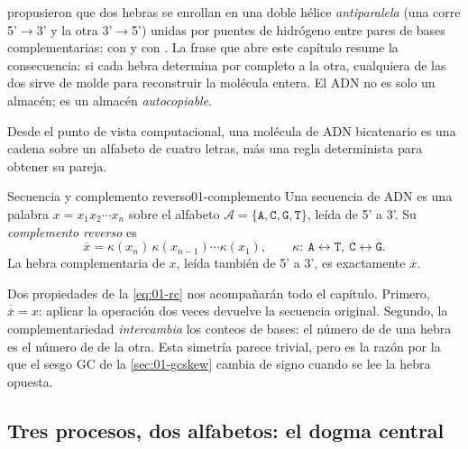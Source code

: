 \textcite{c01-watson1953} propusieron que dos hebras se enrollan en una doble hélice \emph{antiparalela} (una corre 5'$\to$3' y la otra 3'$\to$5') unidas por puentes de hidrógeno entre pares de bases complementarias:  con  y  con . La frase que abre este capítulo resume la consecuencia: si cada hebra determina por completo a la otra, cualquiera de las dos sirve de molde para reconstruir la molécula entera. El ADN no es solo un almacén; es un almacén \emph{autocopiable}.

Desde el punto de vista computacional, una molécula de ADN bicatenario es una cadena sobre un alfabeto de cuatro letras, más una regla determinista para obtener su pareja.

\begin{definicion}{Secuencia y complemento reverso}{01-complemento}
Una secuencia de ADN es una palabra $x = x_1x_2\cdots x_n$ sobre el alfabeto $\mathcal{A}=\{\texttt{A},\texttt{C},\texttt{G},\texttt{T}\}$, leída de 5' a 3'. Su \emph{complemento reverso} es
\begin{equation}\label{eq:01-rc}
\overline{x} = \kappa(x_n)\,\kappa(x_{n-1})\cdots\kappa(x_1),
\qquad \kappa:\ \texttt{A}\leftrightarrow\texttt{T},\ \texttt{C}\leftrightarrow\texttt{G}.
\end{equation}
La hebra complementaria de $x$, leída también de 5' a 3', es exactamente $\overline{x}$.
\end{definicion}

\begin{simbolos}
\end{simbolos}

Dos propiedades de la \cref{eq:01-rc} nos acompañarán todo el capítulo. Primero, $\overline{\overline{x}}=x$: aplicar la operación dos veces devuelve la secuencia original. Segundo, la complementariedad \emph{intercambia} los conteos de bases: el número de  de una hebra es el número de  de la otra. Esta simetría parece trivial, pero es la razón por la que el sesgo GC de la \cref{sec:01-gcskew} cambia de signo cuando se lee la hebra opuesta.

\subsection{Tres procesos, dos alfabetos: el dogma central}

